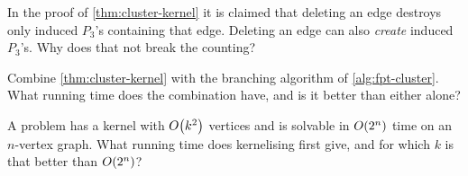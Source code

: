 \begin{exercise}
In the proof of \cref{thm:cluster-kernel} it is claimed that deleting an edge
destroys only induced $P_3$'s containing that edge. Deleting an edge can also
\emph{create} induced $P_3$'s. Why does that not break the counting?
\end{exercise}

\begin{exercise}
Combine \cref{thm:cluster-kernel} with the branching algorithm of
\cref{alg:fpt-cluster}. What running time does the combination have, and is it
better than either alone?
\end{exercise}

\begin{exercise}
A problem has a kernel with $O\!\left(k^2\right)$ vertices and is solvable in
$O\!\left(2^n\right)$ time on an $n$-vertex graph. What running time does kernelising
first give, and for which $k$ is that better than $O\!\left(2^n\right)$?
\end{exercise}

